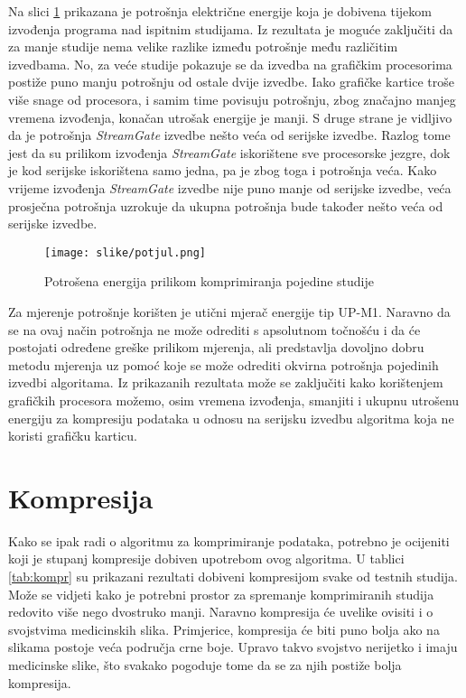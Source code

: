 \documentclass[times, utf8, zavrsni, numeric, sort]{fer}
\begin{document}
Na slici \ref{tab:juli} prikazana je potrošnja električne energije koja je dobivena tijekom izvođenja programa nad ispitnim studijama. Iz rezultata je moguće zaključiti da za manje studije nema velike razlike između potrošnje među različitim izvedbama. No, za veće studije pokazuje se da izvedba na grafičkim procesorima postiže puno manju potrošnju od ostale dvije izvedbe. Iako grafičke kartice troše više snage od procesora, i samim time povisuju potrošnju, zbog značajno manjeg vremena izvođenja, konačan utrošak energije je manji. S druge strane je vidljivo da je potrošnja \emph{StreamGate} izvedbe nešto veća od serijske izvedbe. Razlog tome jest da su prilikom izvođenja \emph{StreamGate} iskorištene sve procesorske jezgre, dok je kod serijske iskorištena samo jedna, pa je zbog toga i potrošnja veća. Kako vrijeme izvođenja \emph{StreamGate} izvedbe nije puno manje od serijske izvedbe, veća prosječna potrošnja uzrokuje da ukupna potrošnja bude također nešto veća od serijske izvedbe.

\begin{figure}[htb]
\centering
\texttt{[image: slike/potjul.png]}
\caption{Potrošena energija prilikom komprimiranja pojedine studije}
\label{tab:juli}
\end{figure}

Za mjerenje potrošnje korišten je utični mjerač energije tip UP-M1. Naravno da se na ovaj način potrošnja ne može odrediti s apsolutnom točnošću i da će postojati određene greške prilikom mjerenja, ali predstavlja dovoljno dobru metodu mjerenja uz pomoć koje se može odrediti okvirna potrošnja pojedinih izvedbi algoritama.
Iz prikazanih rezultata može se zaključiti kako korištenjem grafičkih procesora možemo, osim vremena izvođenja, smanjiti i ukupnu utrošenu energiju za kompresiju podataka u odnosu na serijsku izvedbu algoritma koja ne koristi grafičku karticu.



\section{Kompresija}

Kako se ipak radi o algoritmu za komprimiranje podataka, potrebno je ocijeniti koji je stupanj kompresije dobiven upotrebom ovog algoritma. U tablici \ref{tab:kompr} su prikazani rezultati dobiveni kompresijom svake od testnih studija. Može se vidjeti kako je potrebni prostor za spremanje komprimiranih studija redovito više nego dvostruko manji. Naravno kompresija će uvelike ovisiti i o svojstvima medicinskih slika. Primjerice, kompresija će biti puno bolja ako na slikama postoje veća područja crne boje. Upravo takvo svojstvo nerijetko i imaju medicinske slike, što svakako pogoduje tome da se za njih postiže bolja kompresija.
\end{document}
